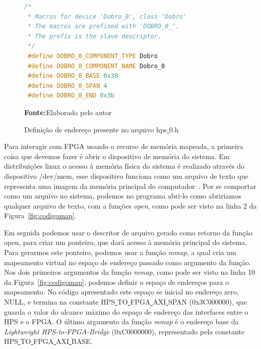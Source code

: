 \begin{figure}[ht]
\caption{Definição de endereço presente no arquivo hps\underline{ }0.h}
\begin{center}
\begin{lstlisting}[language=C++, backgroundcolor=\color{gray!10}]
 /*
 * Macros for device 'Dobro_0', class 'Dobro'
 * The macros are prefixed with 'DOBRO_0_'.
 * The prefix is the slave descriptor.
 */
 #define DOBRO_0_COMPONENT_TYPE Dobro
 #define DOBRO_0_COMPONENT_NAME Dobro_0
 #define DOBRO_0_BASE 0x38
 #define DOBRO_0_SPAN 4
 #define DOBRO_0_END 0x3b
\end{lstlisting}
{\small \textbf{Fonte:}Elaborado pelo autor}	
\end{center}\label{fig:codigodobro}
\end{figure}


Para interagir com FPGA usando o recurso de memória mapeada, a primeira coisa que devemos fazer é abrir o dispositivo de memória do sistema. Em distribuições linux o acesso à memória física do sistema é realizado através do dispositivo /dev/mem, esse dispositivo funciona como um arquivo de texto que representa uma imagem da memória principal do computador~\cite{manmem}. Por se comportar como um arquivo no sistema, podemos no programa abri-lo como abriríamos qualquer arquivo de texto, com a funções \textit{open}, como pode ser visto na linha 2 da Figura~\ref{fig:codigomap}.

Em seguida podemos usar o descritor de arquivo gerado como retorno da função open, para criar um ponteiro, que dará acesso à memória principal do sistema. Para gerarmos este ponteiro, podemos usar a função \textit{mmap}, a qual cria um mapeamento virtual no espaço de endereço passado como argumento da função. Nos dois primeiros argumentos da função \textit{mmap}, como pode ser visto na linha 10 da Figura~\ref{fig:codigomap},  podemos definir o espaço de endereços para o mapeamento. No código apresentado este espaço se inicial no endereço zero, NULL\@, e termina na constante HPS\underline{ }TO\underline{ }FPGA\underline{ }AXI\underline{ }SPAN (0x3C000000), que guarda o valor do alcance máximo do espaço de endereço das interfaces entre o HPS e o FPGA\@. O último argumento da função \textit{mmap} é o endereço base da \textit{Lightweight HPS-to-FPGA-Bridge} (0xC0000000), representado pela constante HPS\underline{ }TO\underline{ }FPGA\underline{ }AXI\underline{ }BASE\@.



